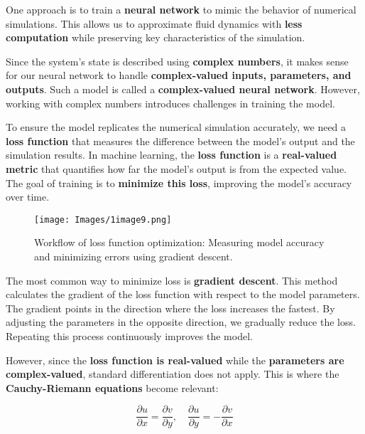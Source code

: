 \documentclass[a4paper,10.5pt]{article}
\begin{document}
\vspace{0.2cm}
One approach is to train a \textbf{neural network} to mimic the behavior of numerical simulations. This allows us to approximate fluid dynamics with \textbf{less computation} while preserving key characteristics of the simulation.
\vspace{0.2cm}

Since the system's state is described using \textbf{complex numbers}, it makes sense for our neural network to handle \textbf{complex-valued inputs, parameters, and outputs}. Such a model is called a \textbf{complex-valued neural network}. However, working with complex numbers introduces challenges in training the model.
\vspace{0.2cm}

To ensure the model replicates the numerical simulation accurately, we need a \textbf{loss function} that measures the difference between the model's output and the simulation results. In machine learning, the \textbf{loss function} is a \textbf{real-valued metric} that quantifies how far the model's output is from the expected value. The goal of training is to \textbf{minimize this loss}, improving the model's accuracy over time.

\begin{figure}[H]
    \centering
    \texttt{[image: Images/1image9.png]}
    \caption{Workflow of loss function optimization: Measuring model accuracy and minimizing errors using gradient descent.}
    \label{fig:galaxy}
\end{figure}

The most common way to minimize loss is \textbf{gradient descent}. This method calculates the gradient of the loss function with respect to the model parameters. The gradient points in the direction where the loss increases the fastest. By adjusting the parameters in the opposite direction, we gradually reduce the loss. Repeating this process continuously improves the model.

\vspace{0.2cm}

However, since the \textbf{loss function is real-valued} while the \textbf{parameters are complex-valued}, standard differentiation does not apply. This is where the \textbf{Cauchy-Riemann equations} become relevant:

\begin{equation}
    \frac{\partial u}{\partial x} = \frac{\partial v}{\partial y}, \quad \frac{\partial u}{\partial y} = - \frac{\partial v}{\partial x}
\end{equation}
\end{document}

